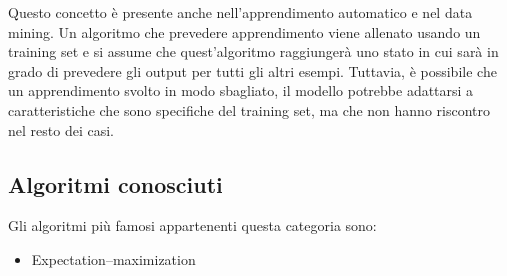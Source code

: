 		Questo concetto è presente anche nell'apprendimento automatico e nel data mining. Un algoritmo che prevedere apprendimento viene allenato usando un training set e si assume che quest'algoritmo raggiungerà uno stato in cui sarà in grado di prevedere gli output per tutti gli altri esempi. Tuttavia, è possibile che un apprendimento svolto in modo sbagliato, il modello potrebbe adattarsi a caratteristiche che sono specifiche del training set, ma che non hanno riscontro nel resto dei casi.

	\subsection{Algoritmi conosciuti}
		Gli algoritmi più famosi appartenenti questa categoria sono:
		\begin{itemize}
			\item Expectation–maximization
		\end{itemize}

